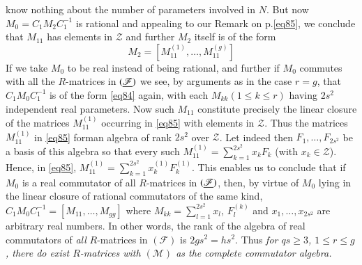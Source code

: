 know nothing about the number of parameters involved in $N$. But now
$M_{0}=C_{1}M_{2}C^{-1}_{1}$ is rational and appealing to our Remark
on p.\@ \eqref{eq85}, we conclude that $M_{11}$ has elements in
$\mathscr{Z}$ and further $M_{2}$ itself is of the form
\begin{equation*}
M_{2}=[M^{(1)}_{11},\ldots,M^{(g)}_{11}]\tag{85}\label{eq85}
\end{equation*}
If we take $M_{0}$ to be real instead of being rational, and further
if $M_{0}$ commutes with all the $R$-matrices in $(\underline{\mathscr{F}})$
we see, by arguments as in the case $r=g$, that $C_{1}M_{0}C^{-1}_{1}$
is of the form \eqref{eq84} again, with each $M_{kk}(1\leq k\leq r)$
having $2s^{2}$ independent real parameters. Now such $M_{11}$
constitute precisely the linear closure of the matrices $M^{(1)}_{11}$
occurring in \eqref{eq85} with elements in $\mathscr{Z}$. Thus the
matrices $M^{(1)}_{11}$ in \eqref{eq85} form\pageoriginale an algebra of
rank $2s^{2}$ over $\mathscr{Z}$. Let indeed then
$F_{1},\ldots,F_{2s^{2}}$ be a basis of this algebra so that every
such $M^{(1)}_{11}=\sum\limits^{2s^{2}}_{k=1}x_{k}F_{k}$ (with
$x_{k}\in\mathscr{Z}$). Hence, in \eqref{eq85},
$M^{(1)}_{11}=\sum\limits^{2s^{2}}_{k=1}x^{(1)}_{k}F^{(1)}_{k}$. This
enables us to conclude that if $M_{0}$ is a real commutator of all
$R$-matrices in $(\underline{\mathscr{F}})$, then, by virtue of $M_{0}$ lying
in the linear closure of rational commutators of the same kind,
$C_{1}M_{0}C^{-1}_{1}=[M_{11},\ldots,M_{gg}]$ where
$M_{kk}=\sum\limits^{2s^{2}}_{l=1} x_{l}$, $F^{(k)}_{l}$ and
$x_{1},\ldots,x_{2s^{2}}$ are arbitrary real numbers. In other words,
the rank of the algebra of real commutators of {\em all} $R$-matrices
in $(\mathscr{F})$ is $2gs^{2}=hs^{2}$. Thus {\em for $qs\geq 3$,
  $1\leq r\leq g$, there do exist $R$-matrices with $(\mathscr{M})$ as
  the complete commutator algebra.}

